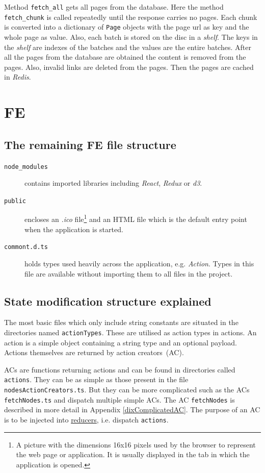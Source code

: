 \begin{appendices}
Method \texttt{fetch\_all} gets all pages from the database. Here the method \texttt{fetch\_chunk} is called repeatedly until the response carries no pages. Each chunk is converted into a dictionary of \texttt{Page} objects with the page url as key and the whole page as value. Also, each batch is stored on the disc in a \textit{shelf}. The keys in the \textit{shelf} are indexes of the batches and the values are the entire batches. After all the pages from the database are obtained the content is removed from the pages. Also, invalid links are deleted from the pages. Then the pages are cached in \textit{Redis}.

\section{FE}
\subsection{The remaining FE file structure}
\begin{description}
    \item[\texttt{node\_modules}] contains imported libraries including \textit{React}, \textit{Redux} or \textit{d3}.
    \item[\texttt{public}] encloses an \textit{.ico} file\footnote {A picture with the dimensions 16x16 pixels used by the browser to represent the web page or application. It is usually displayed in the tab in which the application is opened.} and an HTML file which is the default entry point when the application is started. 
    \item[\texttt{commont.d.ts}] holds types used heavily across the application, e.g. \textit{Action}. Types in this file are available without importing them to all files in the project.
\end{description}

\subsection{State modification structure explained}\label{dixModifyReduxState}
The most basic files which only include string constants are situated in the directories named \texttt{actionTypes}.  These are utilised as action types in actions. An action is a simple object containing a string type and an optional payload. Actions themselves are returned by action creators~(AC). 

ACs are functions returning actions and can be found in directories called \texttt{actions}. They can be as simple as those present in the file \texttt{nodesActionCreators.ts}. But they can be more complicated such as the ACs \texttt{fetchNodes.ts} and dispatch multiple simple ACs. The AC \texttt{fetchNodes} is described in more detail in Appendix \ref{dixComplicatedAC}. The purpose of an AC is to be injected into \hyperlink{reducers}{reducers}, i.e. dispatch \texttt{actions}. 


\end{appendices}
